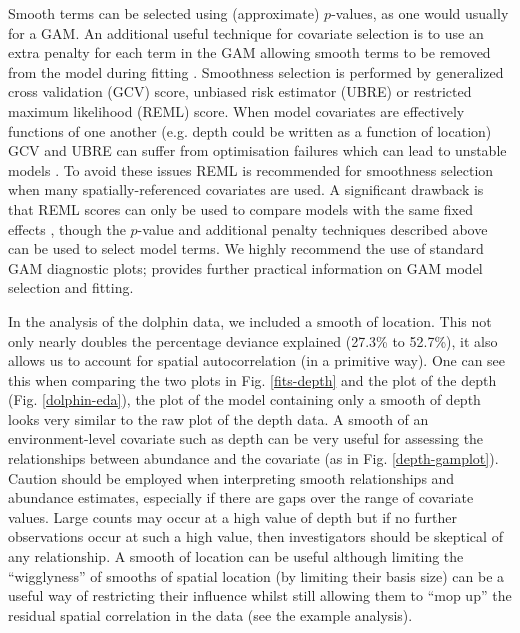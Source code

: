 \documentclass[a4paper,12pt]{article}
\begin{document}
Smooth terms can be selected using (approximate) $p$-values, as one would usually for a GAM. An additional useful technique for covariate selection is to use an extra penalty for each term in the GAM allowing smooth terms to be removed from the model during fitting \citep[illustrated in the example analysis;][]{Wood:ub}. Smoothness selection is performed by generalized cross validation (GCV) score, unbiased risk estimator (UBRE) or restricted maximum likelihood (REML) score. When model covariates are effectively functions of one another (e.g. depth could be written as a function of location) GCV and UBRE can suffer from optimisation failures \cite[][Section 4.5.3]{Wood:2006wz} which can lead to unstable models \citep[][]{Wood:ub}. To avoid these issues REML is recommended for smoothness selection when many spatially-referenced covariates are used. A significant drawback is that REML scores can only be used to compare models with the same fixed effects \citep[i.e. linear terms;][]{Wood:ub}, though the $p$-value and additional penalty techniques described above can be used to select model terms. We highly recommend the use of standard GAM diagnostic plots; \cite{Wood:2006wz} provides further practical information on GAM model selection and fitting.

In the analysis of the dolphin data, we included a smooth of location. This not only nearly doubles the percentage deviance explained (27.3\% to 52.7\%), it also allows us to account for spatial autocorrelation (in a primitive way). One can see this when comparing the two plots in Fig. \ref{fits-depth} and the plot of the depth (Fig. \ref{dolphin-eda}), the plot of the model containing only a smooth of depth looks very similar to the raw plot of the depth data. A smooth of an environment-level covariate such as depth can be very useful for assessing the relationships between abundance and the covariate (as in Fig. \ref{depth-gamplot}). Caution should be employed when interpreting smooth relationships and abundance estimates, especially if there are gaps over the range of covariate values. Large counts may occur at a high value of depth but if no further observations occur at such a high value, then investigators should be skeptical of any relationship. A smooth of location can be useful although limiting the ``wigglyness'' of smooths of spatial location (by limiting their basis size) can be a useful way of restricting their influence whilst still allowing them to ``mop up'' the residual spatial correlation in the data (see the example analysis).
\end{document}
